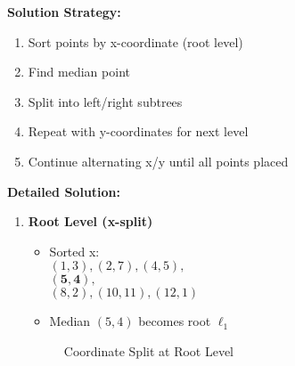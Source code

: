 \textbf{Solution Strategy:}
\begin{enumerate}[leftmargin=*,noitemsep]
    \item Sort points by x-coordinate (root level)
    \item Find median point
    \item Split into left/right subtrees
    \item Repeat with y-coordinates for next level
    \item Continue alternating x/y until all points placed
\end{enumerate}

\textbf{Detailed Solution:}
\begin{enumerate}[leftmargin=*,label=\arabic*.]
    \item \textbf{Root Level (x-split)}
    \begin{itemize}[noitemsep]
        \item Sorted x: \\
        $(1,3), (2,7), (4,5),$ \\
        $\mathbf{(5,4)},$ \\
        $(8,2), (10,11), (12,1)$
        \item Median $(5,4)$ becomes root $\ell_1$
    \end{itemize}

    \begin{figure}[H]
    \centering
    \caption*{Coordinate Split at Root Level}
    \end{figure}


\end{enumerate}
